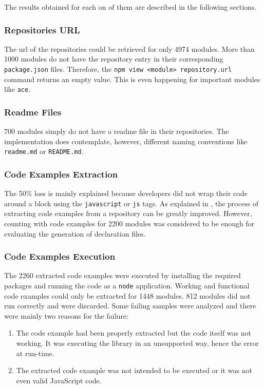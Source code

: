 The results obtained for each on of them are described in the following sections.

\subsubsection{Repositories URL}
The url of the repositories could be retrieved for only 4974 modules. More than 1000 modules do not have the repository entry in their corresponding \texttt{package.json} files. Therefore, the \texttt{npm view <module> repository.url} command returns an empty value. This is even happening for important modules like \texttt{ace}.

\subsubsection{Readme Files}
700 modules simply do not have a readme file in their repositories. The implementation does contemplate, however, different naming conventions like \texttt{readme.md} or \texttt{README.md}.

\subsubsection{Code Examples Extraction}
The 50\% loss is mainly explained because developers did not wrap their code around a block using the \texttt{javascript} or \texttt{js} tags. As explained in , the process of extracting code examples from a repository can be greatly improved. However, counting with code examples for 2200 modules was considered to be enough for evaluating the generation of declaration files.

\subsubsection{Code Examples Execution}
The 2260 extracted code examples were executed by installing the required packages and running the code as a \texttt{node} application. Working and functional code examples could only be extracted for 1448 modules. 812 modules did not run correctly and were discarded. Some failing samples were analyzed and there were mainly two reasons for the failure:
\begin{enumerate}
	\item The code example had been properly extracted but the code itself was not working. It was executing the library in an unsupported way, hence the error at run-time.
	\item The extracted code example was not intended to be executed or it was not even valid JavaScript code.
\end{enumerate}

